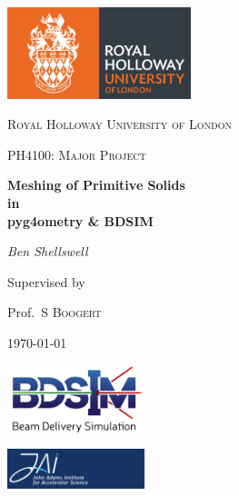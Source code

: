 \documentclass[12pt,a4paper]{article}
\begin{document}
\begin{titlepage}
	\centering
	\includegraphics[width=0.4\textwidth]{Images//Logos//rhul.jpg}\par\vspace{1cm}


	{\scshape\LARGE Royal Holloway University of London \par}
	\vspace{1cm}
	{\scshape\Large PH4100: Major Project\par}
	\vspace{1.5cm}
	{\huge\bfseries Meshing of Primitive Solids\\
	in\\
	pyg4ometry \& BDSIM\par}
	\vspace{2cm}
	{\Large\itshape Ben Shellswell\par}
	\vfill

\begin{abstract}
\centering

\end{abstract}

	\vfill
	
	Supervised by\par
	Prof.~S \textsc{Boogert} 

	{\large \today\par}

\includegraphics[width=0.3\textwidth]{Images//Logos//BDSIM_Logo.jpg}\par\vspace{1cm}
\includegraphics[width=0.3\textwidth]{Images//Logos//JAI_Logo.jpeg}\par\vspace{1cm}

\end{titlepage}
\leavevmode\thispagestyle{empty}\newpage
\tableofcontents
\thispagestyle{empty}
\newpage
\onecolumn
\end{document}
